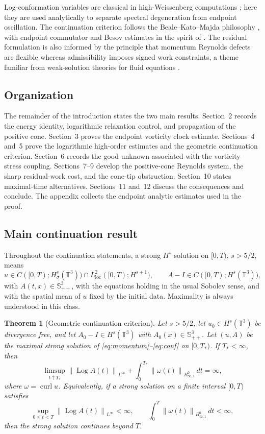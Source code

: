\documentclass[11pt]{article}
\numberwithin{equation}{section}
\newtheorem{theorem}{Theorem}[section]
\newcommand{\T}{\mathbb T}
\newcommand{\Id}{I}
\newcommand{\Spp}{\mathbb S_{++}}
\newcommand{\curl}{\operatorname{curl}}
\newcommand{\Log}{\operatorname{Log}}
\newcommand{\Besov}{B^0_{\infty,1}}
\newcommand{\norm}[1]{\left\lVert #1\right\rVert}
\begin{document}
Log-conformation variables are classical in high-Weissenberg computations
\cite{FattalKupferman}; here they are used analytically to separate spectral
degeneration from endpoint oscillation.  The continuation criterion follows
the Beale--Kato--Majda philosophy \cite{BKM}, with endpoint commutator and
Besov estimates in the spirit of \cite{KatoPonce,BCD}.  The residual
formulation is also informed by the principle that momentum Reynolds defects
are flexible whereas admissibility imposes signed work constraints, a theme
familiar from weak-solution theories for fluid equations
\cite{DeLellisSzekelyhidi}.

\subsection*{Organization}

The remainder of the introduction states the two main results.  Section~2
records the energy identity, logarithmic relaxation control, and propagation of
the positive cone.  Section~3 proves the endpoint vorticity clock estimate.
Sections~4 and~5 prove the logarithmic high-order estimates and the geometric
continuation criterion.  Section~6 records the good unknown associated with
the vorticity--stress coupling.  Sections~7--9 develop the positive-cone
Reynolds system, the sharp residual-work cost, and the cone-tip obstruction.
Section~10 states maximal-time alternatives.  Sections~11 and~12 discuss the
consequences and conclude.  The appendix collects the endpoint analytic
estimates used in the proof.
\subsection*{Main continuation result}

Throughout the continuation statements, a strong \(H^s\) solution on
\([0,T)\), \(s>5/2\), means
\[
  u\in C([0,T);H^s_\sigma(\T^3))\cap L^2_{\mathrm{loc}}([0,T);H^{s+1}),
  \qquad
  A-\Id\in C([0,T);H^s(\T^3)),
\]
with \(A(t,x)\in\Spp^3\), with the equations holding in the usual Sobolev
sense, and with the spatial mean of \(u\) fixed by the initial data.  Maximality
is always understood in this class.

\begin{theorem}[Geometric continuation criterion]
\label{thm:main}
Let \(s>5/2\), let \(u_0\in H^s(\T^3)\) be divergence free, and let
\(A_0-\Id\in H^s(\T^3)\) with \(A_0(x)\in\Spp^3\).  Let \((u,A)\) be the
maximal strong solution of \eqref{eq:momentum}--\eqref{eq:conf} on
\([0,T_*)\).  If \(T_*<\infty\), then
\begin{equation}
  \limsup_{t\uparrow T_*}\norm{\Log A(t)}_{L^\infty}
  +
  \int_0^{T_*}\norm{\omega(t)}_{\Besov}\,dt
  =\infty ,
  \label{eq:main-criterion}
\end{equation}
where \(\omega=\curl u\).  Equivalently, if a strong solution on a finite
interval \([0,T)\) satisfies
\[
  \sup_{0\le t<T}\norm{\Log A(t)}_{L^\infty}<\infty,
  \qquad
  \int_0^T\norm{\omega(t)}_{\Besov}\,dt<\infty,
\]
then the strong solution continues beyond \(T\).
\end{theorem}
\end{document}
